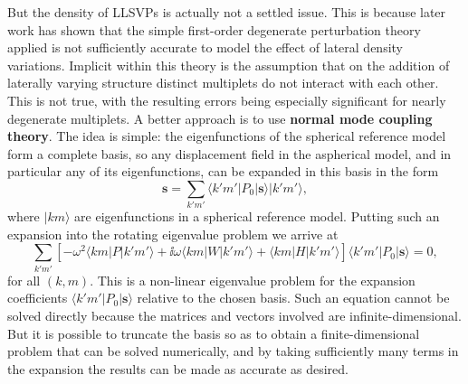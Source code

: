 But the density of LLSVPs is actually not a settled issue. 
This is because later work has shown that the simple first-order degenerate perturbation theory applied is not sufficiently accurate to 
model the effect of lateral density variations. Implicit within this theory is the assumption that on the addition of laterally varying structure
distinct multiplets do not interact with each other. This is not true, with the resulting errors being especially significant 
for nearly degenerate multiplets. A better approach is to use \textbf{normal mode coupling theory}. The idea is simple: the eigenfunctions of 
the spherical reference model form a complete basis, so any displacement field in the aspherical model, and in particular any of its 
eigenfunctions, can be expanded in this basis in the form
\begin{equation}\label{eq:34}
\mathbf{s}=\sum_{k'm'}\langle k'm'|P_{0}|\mathbf{s}\rangle|k'm'\rangle,
\end{equation}
where $|km\rangle$ are eigenfunctions in a spherical reference model. Putting such an expansion into the rotating eigenvalue problem we arrive at
\begin{equation}\label{eq:35}
\sum_{k'm'}[-\omega^{2}\langle km|P|k'm'\rangle+\ii\omega\langle km|W|k'm'\rangle+\langle km|H|k'm'\rangle]\langle k'm'|P_{0}|\mathbf{s}\rangle=0,
\end{equation}
for all $(k,m)$. This is a non-linear eigenvalue problem for the expansion coefficients $\langle k'm'|P_{0}|\mathbf{s}\rangle$ relative 
to the chosen basis. Such an equation cannot be solved directly because the matrices and vectors involved are infinite-dimensional. But it is 
possible to truncate the basis so as to obtain a finite-dimensional problem that can be solved numerically, and by taking sufficiently many 
terms in the expansion the results can be made as accurate as desired.

